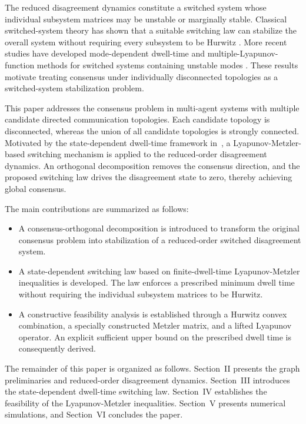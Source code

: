 \documentclass[conference]{IEEEtran}
\begin{document}
	The reduced disagreement dynamics constitute a switched system whose
	individual subsystem matrices may be unstable or marginally stable.
	Classical switched-system theory has shown that a suitable switching
	law can stabilize the overall system without requiring every
	subsystem to be Hurwitz
	\cite{liberzon2003,geromel2006,zhai2001}. More recent studies have
	developed mode-dependent dwell-time and multiple-Lyapunov-function
	methods for switched systems containing unstable modes
	\cite{jin2023,yin2023}. These results motivate treating consensus
	under individually disconnected topologies as a switched-system
	stabilization problem.
	
	This paper addresses the consensus problem in multi-agent systems with multiple
	candidate directed communication topologies. Each candidate topology
	is disconnected, whereas the union of all candidate topologies is
	strongly connected. Motivated by the state-dependent dwell-time
	framework in~\cite{russo2025}, a Lyapunov-Metzler-based switching
	mechanism is applied to the reduced-order disagreement dynamics. An
	orthogonal decomposition removes the consensus direction, and the
	proposed switching law drives the disagreement state to zero, thereby
	achieving global consensus.
	
	The main contributions are summarized as follows:
	\begin{itemize}
		\item A consensus-orthogonal decomposition is introduced to
		transform the original consensus problem into stabilization of a
		reduced-order switched disagreement system.
		
		\item A state-dependent switching law based on finite-dwell-time
		Lyapunov-Metzler inequalities is developed. The law enforces a
		prescribed minimum dwell time without requiring the individual
		subsystem matrices to be Hurwitz.
		
		\item A constructive feasibility analysis is established through
		a Hurwitz convex combination, a specially constructed Metzler
		matrix, and a lifted Lyapunov operator. An explicit sufficient
		upper bound on the prescribed dwell time is consequently derived.
	\end{itemize}
	
	The remainder of this paper is organized as follows. Section~II
	presents the graph preliminaries and reduced-order disagreement
	dynamics. Section~III introduces the state-dependent dwell-time
	switching law. Section~IV establishes the feasibility of the
	Lyapunov-Metzler inequalities. Section~V presents numerical
	simulations, and Section~VI concludes the paper.
	
\end{document}
